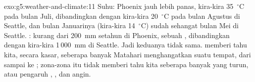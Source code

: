 \begin{solution}{exo:g5:weather-and-climate:11}
Suhu: Phoenix jauh lebih panas, kira-kira 35~$^\circ$C pada bulan Juli,
dibandingkan dengan kira-kira 20~$^\circ$C pada bulan Agustus di Seattle,
dan bulan Januarinya (kira-kira 14~$^\circ$C) sudah sehangat bulan Mei di
Seattle. : kurang dari 200~mm setahun di Phoenix, sebuah ,
dibandingkan dengan kira-kira 1\,000~mm di Seattle. Jadi  keduanya
tidak sama.  memberi tahu kita, secara kasar, seberapa
banyak Matahari menghangatkan suatu tempat, dari  sampai ke
; zona-zona itu tidak memberi tahu kita seberapa banyak  yang
turun, atau pengaruh , , dan angin.
\end{solution}
